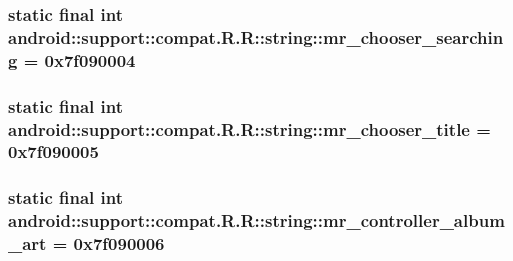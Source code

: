 \hypertarget{classandroid_1_1support_1_1compat_1_1_r_1_1string_0bb94d22be3f54a44e1af50d2609af63}{
\subsubsection[{mr\_\-chooser\_\-searching}]{\setlength{\rightskip}{0pt plus 5cm}static final int android::support::compat.R.R::string::mr\_\-chooser\_\-searching = 0x7f090004}}
\label{classandroid_1_1support_1_1compat_1_1_r_1_1string_0bb94d22be3f54a44e1af50d2609af63}


\hypertarget{classandroid_1_1support_1_1compat_1_1_r_1_1string_1f5d18d3ed03c492a89c29e4c93689ac}{
\subsubsection[{mr\_\-chooser\_\-title}]{\setlength{\rightskip}{0pt plus 5cm}static final int android::support::compat.R.R::string::mr\_\-chooser\_\-title = 0x7f090005}}
\label{classandroid_1_1support_1_1compat_1_1_r_1_1string_1f5d18d3ed03c492a89c29e4c93689ac}


\hypertarget{classandroid_1_1support_1_1compat_1_1_r_1_1string_b91d8c18e1fb6fd185bda5e9f5de3975}{
\subsubsection[{mr\_\-controller\_\-album\_\-art}]{\setlength{\rightskip}{0pt plus 5cm}static final int android::support::compat.R.R::string::mr\_\-controller\_\-album\_\-art = 0x7f090006}}
\label{classandroid_1_1support_1_1compat_1_1_r_1_1string_b91d8c18e1fb6fd185bda5e9f5de3975}



